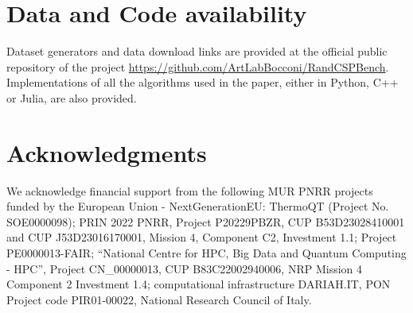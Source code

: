 \documentclass{article}
\begin{document}
\section{Data and Code availability}

Dataset generators and data download links are provided at the official public repository of the project \url{https://github.com/ArtLabBocconi/RandCSPBench}. 
Implementations of all the algorithms used in the paper, either in Python, C++ or Julia, are also provided.


\section*{Acknowledgments}


We acknowledge financial support from the following MUR PNRR projects funded by the European Union - NextGenerationEU: ThermoQT (Project No. SOE0000098);  PRIN 2022 PNRR, Project P20229PBZR, CUP B53D23028410001 and CUP J53D23016170001, Mission 4, Component C2, Investment 1.1;  Project PE0000013-FAIR; “National Centre for HPC, Big Data and Quantum Computing - HPC”, Project CN\_00000013, CUP B83C22002940006, NRP Mission 4 Component 2 Investment 1.4; computational infrastructure DARIAH.IT, PON Project code PIR01-00022, National
Research Council of Italy.
\end{document}
